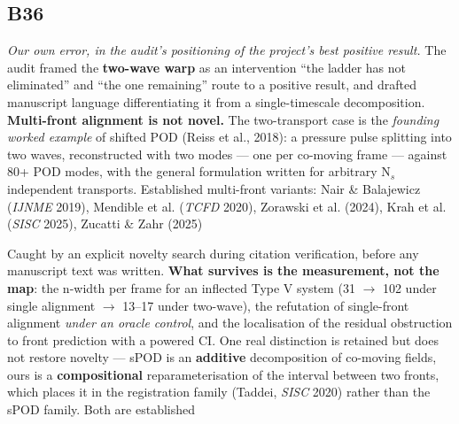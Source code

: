 \documentclass[10pt]{article}
\begin{document}
\subsection*{B36}\label{led:B36}
\begin{description}[leftmargin=0pt,itemsep=1pt]
\item[Defect.] \emph{Our own error, in the audit's positioning of the project's best positive result.} The audit framed the \textbf{two-wave warp} as an intervention ``the ladder has not eliminated'' and ``the one remaining'' route to a positive result, and drafted manuscript language differentiating it from a single-timescale decomposition. \textbf{Multi-front alignment is not novel.} The two-transport case is the \emph{founding worked example} of shifted POD (Reiss et al., 2018): a pressure pulse splitting into two waves, reconstructed with two modes --- one per co-moving frame --- against 80+ POD modes, with the general formulation written for arbitrary N$_s$ independent transports. Established multi-front variants: Nair \& Balajewicz (\emph{IJNME} 2019), Mendible et al. (\emph{TCFD} 2020), Zorawski et al. (2024), Krah et al. (\emph{SISC} 2025), Zucatti \& Zahr (2025)
\item[How it was caught.] Caught by an explicit novelty search during citation verification, before any manuscript text was written. \textbf{What survives is the measurement, not the map}: the n-width per frame for an inflected Type V system (31 $\rightarrow$ 102 under single alignment $\rightarrow$ 13--17 under two-wave), the refutation of single-front alignment \emph{under an oracle control}, and the localisation of the residual obstruction to front prediction with a powered CI. One real distinction is retained but does not restore novelty --- sPOD is an \textbf{additive} decomposition of co-moving fields, ours is a \textbf{compositional} reparameterisation of the interval between two fronts, which places it in the registration family (Taddei, \emph{SISC} 2020) rather than the sPOD family. Both are established
\end{description}
\end{document}
